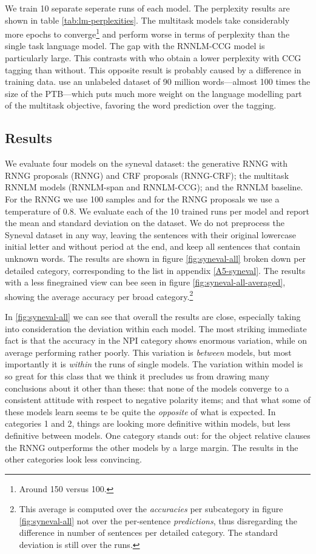     

    We train 10 separate seperate runs of each model. The perplexity results are shown in table \ref{tab:lm-perplexities}. The multitask models take considerably more epochs to converge\footnote{Around 150 versus 100.} and perform worse in terms of perplexity than the single task language model. The gap with the RNNLM-CCG model is particularly large. This contrasts with \citet{linzen2018targeted} who obtain a lower perplexity with CCG tagging than without. This opposite result is probably caused by a difference in training data. \citet{linzen2018targeted} use an unlabeled dataset of 90 million words---almost 100 times the size of the PTB---which puts much more weight on the language modelling part of the multitask objective, favoring the word prediction over the tagging.

  \subsection{Results}
    We evaluate four models on the syneval dataset: the generative RNNG with RNNG proposals (RNNG) and CRF proposals (RNNG-CRF); the multitask RNNLM models (RNNLM-span and RNNLM-CCG); and the RNNLM baseline. For the RNNG we use 100 samples and for the RNNG proposals we use a temperature of 0.8. We evaluate each of the 10 trained runs per model and report the mean and standard deviation on the dataset. We do not preprocess the Syneval dataset in any way, leaving the sentences with their original lowercase initial letter and without period at the end, and keep all sentences that contain unknown words. The results are shown in figure \ref{fig:syneval-all} broken down per detailed category, corresponding to the list in appendix \ref{A5-syneval}. The results with a less finegrained view can bee seen in figure \ref{fig:syneval-all-averaged}, showing the average accuracy per broad category.\footnote{This average is computed over the \textit{accuracies} per subcategory in figure \ref{fig:syneval-all} not over the per-sentence \textit{predictions}, thus disregarding the difference in number of sentences per detailed category. The standard deviation is still over the runs.}

    In \ref{fig:syneval-all} we can see that overall the results are close, especially taking into consideration the deviation within each model. The most striking immediate fact is that the accuracy in the NPI category shows enormous variation, while on average performing rather poorly. This variation is \textit{between} models, but most importantly it is \textit{within} the runs of single models. The variation within model is so great for this class that we think it precludes us from drawing many conclusions about it other than these: that none of the models converge to a consistent attitude with respect to negative polarity items; and that what some of these models learn seems te be quite the \textit{opposite} of what is expected. In categories 1 and 2, things are looking more definitive within models, but less definitive between models. One category stands out: for the object relative clauses the RNNG outperforms the other models by a large margin. The results in the other categories look less convincing.

